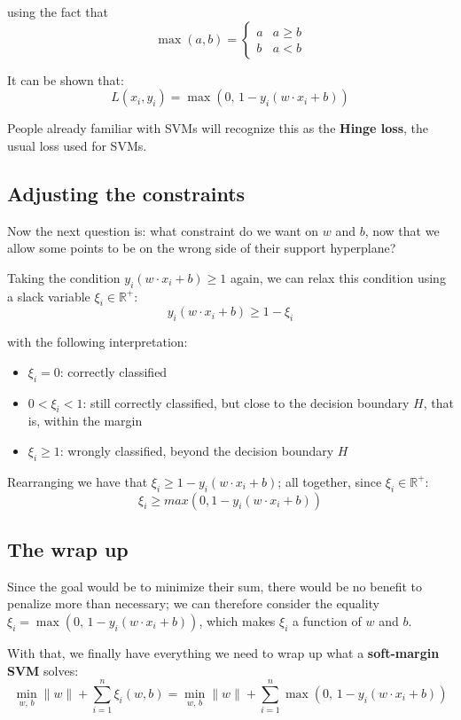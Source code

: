 \documentclass[12pt,a4paper]{article}
\begin{document}
using the fact that
\[
\max(a, b) = \begin{cases} a & a \geq b \\ b & a < b \end{cases}
\]

It can be shown that:
\[
L(x_i, y_i) = \max\!\left(0,\, 1 - y_i(w \cdot x_i + b)\right)
\]

People already familiar with SVMs will recognize this as the \textbf{Hinge loss}, the usual loss used for SVMs.

\subsection{Adjusting the constraints}

Now the next question is: what constraint do we want on $w$ and $b$, now that we allow some points to be on the wrong side of their support hyperplane?

Taking the condition $y_i(w \cdot x_i + b) \geq 1$ again, we can relax this condition using a slack variable $\xi_i \in \mathbb{R}^+$:
\[
y_i(w \cdot x_i + b) \geq 1 - \xi_i
\]

with the following interpretation:
\begin{itemize}
    \item $\xi_i = 0$: correctly classified
    \item $0 < \xi_i < 1$: still correctly classified, but close to the decision boundary $H$, that is, within the margin
    \item $\xi_i \geq 1$: wrongly classified, beyond the decision boundary $H$
\end{itemize}

Rearranging we have that $\xi_i \geq 1 - y_i(w \cdot x_i + b)$; all together, since $\xi_i \in \mathbb{R}^+$:
\[
\xi_i \geq max(0, 1 - y_i(w \cdot x_i + b))
\]

\subsection{The wrap up}

Since the goal would be to minimize their sum, there would be no benefit to penalize more than necessary; we can therefore consider the equality $\xi_i = \max(0,\, 1 - y_i(w \cdot x_i + b))$, which makes $\xi_i$ a function of $w$ and $b$.

With that, we finally have everything we need to wrap up what a \textbf{soft-margin SVM} solves:
\[
\min_{w,\,b} \|w\| + \sum_{i=1}^{n} \xi_i(w, b) = \min_{w,\,b} \|w\| + \sum_{i=1}^{n} \max\!\left(0,\, 1 - y_i(w \cdot x_i + b)\right)
\]
\end{document}
